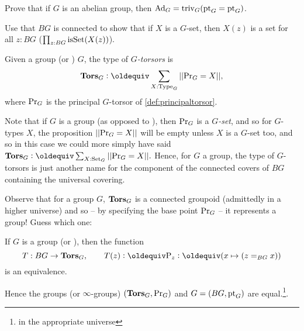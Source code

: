 \begin{xca}
  Prove that if $G$ is an abelian group, then $\mathrm{Ad}_G=\mathrm{triv}_G({\mathord{\mathrm{pt}}}_G={\mathord{\mathrm{pt}}}_G)$.
\end{xca}
\begin{xca}
  Use that $BG$ is connected to show that if $X$ is a $G$-set, then $X(z)$ is a set for all $z:BG$ (\ie $\prod_{z:BG}\mathrm{isSet}(X(z))$).
\end{xca}
\begin{definition}
  Given a group (or \inftygp) $G$, the type of {\em$G$-torsors} is
$$\typetorsor_G\defequi\sum_{X:\Type_G}||\princ G=X||,$$
where $\mathrm{Pr}_{{G}}$ is the principal $G$-torsor of \cref{def:principaltorsor}.
\end{definition}
\begin{remark}
  Note that if $G$ is a group (as opposed to \aninftygp), then $\mathrm{Pr}_{{G}}$ is a $G${\em-set}, and so for $G$-types $X$, the proposition $||\mathrm{Pr}_{{G}}=X||$ will be empty unless $X$ is a $G$-set too, and so in this case we could more simply have said $\typetorsor_G\defequi\sum_{X:\Set_G}||\princ G=X||.$  Hence, for $G$ a group, the type of $G$-torsors is just another name for the component of the connected covers of $BG$ containing the universal covering.

Observe that for a group $G$, $\mathbf{Tors}_G$ is a connected groupoid (admittedly in a higher universe) and so -- by specifying the base point $\mathrm{Pr}_{{G}}$ -- it represents a group!  Guess which one:
\end{remark}
\begin{lemma}\label{lem:BGbytorsor}
  If $G$ is a group (or \inftygp), then the function
$$T:BG\to\typetorsor_G,\qquad T(z)\defequi \pathsp z\defequi(x\mapsto(z=_{BG}x))$$
is an equivalence.

Hence the groups (or $\infty$-groups) $(\mathbf{Tors}_G,\mathrm{Pr}_{{G}})$ and $G=(BG,{\mathord{\mathrm{pt}}}_G)$ are equal.\footnote{in the appropriate universe}.
\end{lemma}

